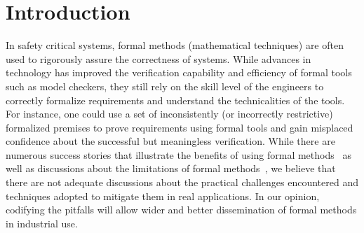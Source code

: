 \section{Introduction}
\label{sec:intro}


In safety critical systems, formal methods (mathematical techniques) are often used to rigorously assure the correctness of systems. %
While advances in technology has improved the verification capability and efficiency of formal tools such as model checkers, they still rely on the skill level of the engineers to correctly formalize requirements
and understand the technicalities of the tools. For instance, one could use a set of inconsistently (or incorrectly restrictive) formalized premises to prove requirements using formal tools and gain misplaced confidence about the successful but meaningless verification. While there are numerous success stories that illustrate the benefits of using formal methods~\cite{Miller03:shalls,Whalen07:FMICS} as well as discussions about the limitations of formal methods~\cite{kneuper1997limits,hall1990seven}, we believe that %
there are not adequate discussions about the practical challenges encountered and techniques adopted to mitigate them in real applications.
In our opinion, codifying the pitfalls will allow wider and better dissemination of formal methods in industrial use.

